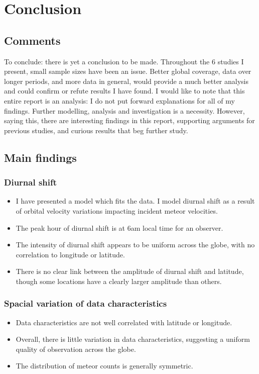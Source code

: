 \chapter{Conclusion}
\section{Comments}
To conclude: there is yet a conclusion to be made. Throughout the 6 studies I present, small sample sizes have been an issue. Better global coverage, data over longer periods, and more data in general, would provide a much better analysis and could confirm or refute results I have found. I would like to note that this entire report is an analysis: I do not put forward explanations for all of my findings. Further modelling, analysis and investigation is a necessity. However, saying this, there are interesting findings in this report, supporting arguments for previous studies, and curious results that beg further study.
\section{Main findings}
\subsection{Diurnal shift}
\begin{itemize}
	\item I have presented a model which fits the data. I model diurnal shift as a result of orbital velocity variations impacting incident meteor velocities.
	\item The peak hour of diurnal shift is at 6am local time for an observer.
	\item The intensity of diurnal shift appears to be uniform across the globe, with no correlation to longitude or latitude.
	\item There is no clear link between the amplitude of diurnal shift and latitude, though some locations have a clearly larger amplitude than others.
\end{itemize}
\subsection{Spacial variation of data characteristics}
\begin{itemize}
	\item Data characteristics are not well correlated with latitude or longitude.
	\item Overall, there is little variation in data characteristics, suggesting a uniform quality of observation across the globe.
	\item The distribution of meteor counts is generally symmetric.
\end{itemize}

